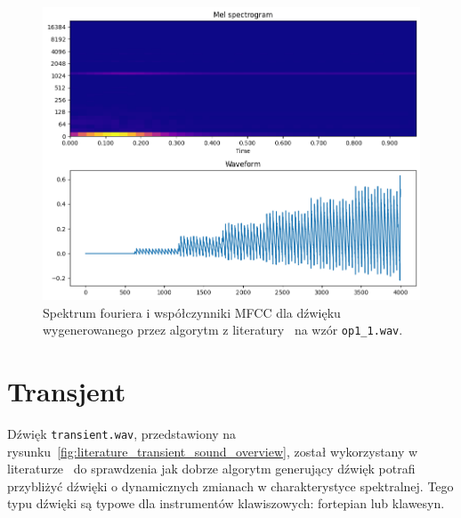 \begin{multicols}{3}
\begin{figure}[H]
    \centering
    \includegraphics[width=0.9\linewidth]{rys06/macret_evolved_op1.png}
    \caption{
      Spektrum fouriera i współczynniki MFCC dla dźwięku wygenerowanego
      przez algorytm z literatury~\cite{evolutionary_puredata} na wzór \texttt{op1\_1.wav}.
    }\label{fig:evolved_literature_op1_sound_overview}
\end{figure}
\end{multicols}

\section{Transjent}

Dźwięk \texttt{transient.wav}, przedstawiony na rysunku~\ref{fig:literature_transient_sound_overview},
został wykorzystany w literaturze~\cite{evolutionary_puredata} do sprawdzenia jak dobrze algorytm
generujący dźwięk potrafi przybliżyć dźwięki o dynamicznych zmianach w charakterystyce spektralnej.
Tego typu dźwięki są typowe dla instrumentów klawiszowych: fortepian lub klawesyn.

